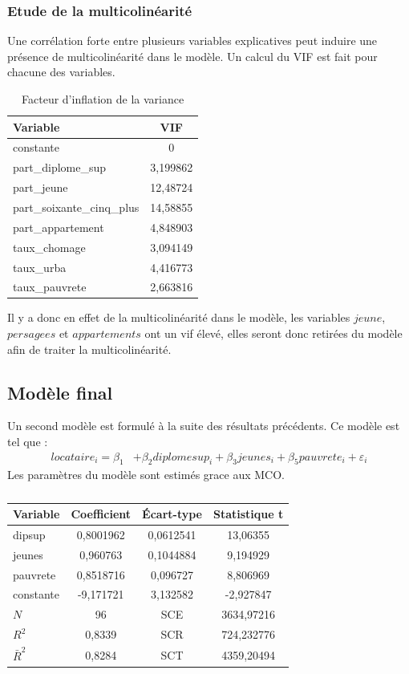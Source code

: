 \documentclass{article}
\begin{document}
\subsubsection{Etude de la multicolinéarité}
Une corrélation forte entre plusieurs variables explicatives peut induire une présence de multicolinéarité dans le modèle. Un calcul du VIF est fait pour chacune des variables.
\begin{table}[H]
\centering
\caption{Facteur d'inflation de la variance}
\begin{tabular}{l*{1}{c}}
\toprule
Variable            &         VIF\\
\midrule
constante & 0 \\
part\_diplome\_sup&    3,199862\\
part\_jeune  &    12,48724\\
part\_soixante\_cinq\_plus&    14,58855\\
part\_appartement&    4,848903\\
taux\_chomage&    3,094149\\
taux\_urba   &    4,416773\\
taux\_pauvrete&    2,663816\\
\bottomrule
\end{tabular}
\end{table}
Il y a donc en effet de la multicolinéarité dans le modèle, les variables $jeune$, $persagees$ et $appartements$ ont un vif
élevé, elles seront donc retirées du modèle afin de traiter la multicolinéarité.
\subsection{Modèle final}
Un second modèle est formulé à la suite des résultats précédents. Ce modèle est tel que :
\begin{equation*}
    \begin{split}
            locataire_i =  \beta_1 &+ \beta_2diplomesup_i + \beta_3jeunes_i + \beta_5pauvrete_i + \varepsilon_i 
    \end{split}
\end{equation*}
Les paramètres du modèle sont estimés grace aux MCO.
\begin{table}[H]
\centering
\caption{}
\label{table:secondeReg}
\begin{tabular}{l*{1}{ccc}}
\toprule
Variable            & Coefficient&  Écart-type&Statistique t\\
\midrule
dipsup&    0,8001962&    0,0612541&    13,06355\\
jeunes  &     0,960763&    0,1044884&    9,194929\\
pauvrete&    0,8518716&     0,096727&    8,806969\\
constante      &   -9,171721&    3,132582&   -2,927847\\
\midrule
$N$       &          96& SCE           &   3634,97216           \\
$R^{2}$ & 0,8339 & SCR & 724,232776   \\ 
$\bar{R}^2$ & 0,8284 & SCT & 4359,20494\\ 
\bottomrule
\end{tabular}
\end{table}
\end{document}
